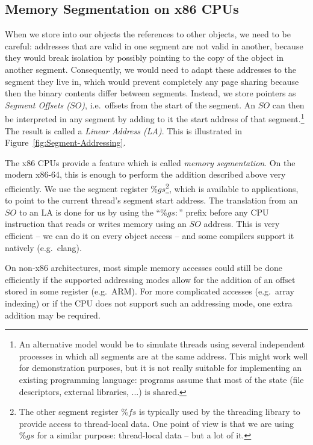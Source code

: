 \documentclass{sigplanconf}
\begin{document}
\subsection{Memory Segmentation on x86 CPUs}

When we store into our objects the references to other objects, we
need to be careful: addresses that are valid in one segment are not
valid in another, because they would break isolation by possibly pointing to
the copy of the object in another segment.  Consequently, we would
need to adapt these addresses to the segment they live in, which would
prevent completely any page sharing because then the binary contents
differ between segments.  Instead, we store pointers as
\emph{Segment Offsets ($SO$)}, i.e.\ offsets from the start of the
segment.  An $SO$ can then be interpreted in any segment by adding to
it the start address of that segment.\footnote{An alternative model
would be to simulate threads using several independent processes in
which all segments are at the same address.  This might work well for
demonstration purposes, but it is not really suitable for implementing
an existing programming language: programs assume that most of the
state (file descriptors, external libraries, ...) is shared.} The
result is called a \emph{Linear Address (LA)}. This is illustrated in
Figure~\ref{fig:Segment-Addressing}.

The x86 CPUs provide a feature which is called \emph{memory
segmentation}.  On the modern x86-64, this is enough to perform the
addition described above very efficiently.  We use the segment
register $\%gs$\footnote{The other segment register $\%fs$ is
typically used by the threading library to provide access to
thread-local data.  One point of view is that we are using $\%gs$ for
a similar purpose: thread-local data -- but a lot of it.}, which is
available to applications, to point to the current thread's segment
start address.  The translation from an $SO$ to an LA is done for us by
using the ``$\%gs\colon$'' prefix before any CPU instruction that
reads or writes memory using an $SO$ address.  This is very efficient
-- we can do it on every object access -- and some compilers support it
natively (e.g.\ clang).

On non-x86 architectures, most simple memory accesses could still be
done efficiently if the supported addressing modes allow for the
addition of an offset stored in some register (e.g.\ ARM). For more
complicated accesses (e.g.\ array indexing) or if the CPU does not
support such an addressing mode, one extra addition may be required.
\end{document}
